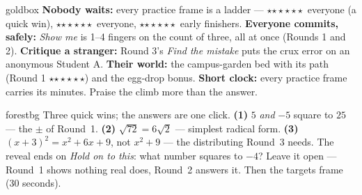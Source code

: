 \documentclass[10pt]{article}
\newcommand{\rung}[1]{{\color{goldacc}\ifcase#1\or$\star$\or$\star\star$\or$\star\star\star$\fi}}
\begin{document}
\begin{skillbox}{goldbox}
\textbf{Nobody waits:} every practice frame is a ladder --- \rung1\ everyone (a quick win),
\rung2\ everyone, \rung3\ early finishers. \textbf{Everyone commits, safely:} \emph{Show me} is
1--4 fingers on the count of three, all at once (Rounds 1 and 2). \textbf{Critique a stranger:}
Round 3's \emph{Find the mistake} puts the crux error on an anonymous Student A.
\textbf{Their world:} the campus-garden bed with its path (Round 1 \rung3) and the egg-drop
bonus. \textbf{Short clock:} every practice frame carries its minutes. Praise the climb more
than the answer.
\end{skillbox}

\begin{skillbox}{forestbg}
Three quick wins; the answers are one click. \textbf{(1)} $5$ \emph{and} $-5$ square to $25$ ---
the $\pm$ of Round~1. \textbf{(2)} $\sqrt{72}=6\sqrt2$ --- simplest radical form. \textbf{(3)}
$(x+3)^2=x^2+6x+9$, not $x^2+9$ --- the distributing Round~3 needs. The reveal ends on
\emph{Hold on to this}: what number squares to $-4$? Leave it open --- Round~1 shows nothing
real does, Round~2 answers it. Then the targets frame (30 seconds).
\end{skillbox}
\end{document}
